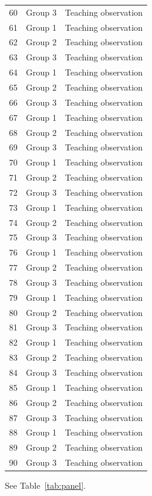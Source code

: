 \documentclass[11pt]{article}
\begin{document}
\begin{longtable}{@{}rll@{}}
60 & Group 3 & Teaching observation \\
61 & Group 1 & Teaching observation \\
62 & Group 2 & Teaching observation \\
63 & Group 3 & Teaching observation \\
64 & Group 1 & Teaching observation \\
65 & Group 2 & Teaching observation \\
66 & Group 3 & Teaching observation \\
67 & Group 1 & Teaching observation \\
68 & Group 2 & Teaching observation \\
69 & Group 3 & Teaching observation \\
70 & Group 1 & Teaching observation \\
71 & Group 2 & Teaching observation \\
72 & Group 3 & Teaching observation \\
73 & Group 1 & Teaching observation \\
74 & Group 2 & Teaching observation \\
75 & Group 3 & Teaching observation \\
76 & Group 1 & Teaching observation \\
77 & Group 2 & Teaching observation \\
78 & Group 3 & Teaching observation \\
79 & Group 1 & Teaching observation \\
80 & Group 2 & Teaching observation \\
81 & Group 3 & Teaching observation \\
82 & Group 1 & Teaching observation \\
83 & Group 2 & Teaching observation \\
84 & Group 3 & Teaching observation \\
85 & Group 1 & Teaching observation \\
86 & Group 2 & Teaching observation \\
87 & Group 3 & Teaching observation \\
88 & Group 1 & Teaching observation \\
89 & Group 2 & Teaching observation \\
90 & Group 3 & Teaching observation \\
\end{longtable}
See Table~\ref{tab:panel}.
\end{document}
